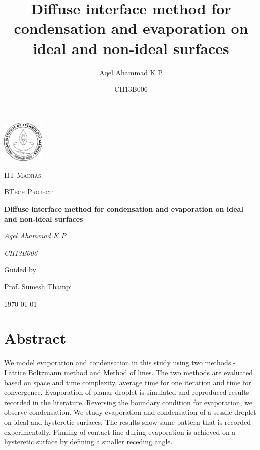 \documentclass[11pt]{article}
\title{Diffuse interface method for condensation and evaporation on ideal and non-ideal surfaces}
\date{CH13B006}
\author{Aqel Ahammad K P}
\begin{document}
\begin{titlepage}
			\centering
			\includegraphics[width=0.15\textwidth]{images/others/iitm_logo}\par\vspace{1cm}
			{\scshape\LARGE IIT Madras \par}
			\vspace{1cm}
			{\scshape\Large BTech Project\par}
			\vspace{1.5cm}
			{\huge\bfseries Diffuse interface method for condensation and evaporation on ideal and non-ideal surfaces\par}
			\vspace{2cm}
			{\Large\itshape Aqel Ahammad K P\par}
			{\Large\itshape CH13B006\par}
			\vfill
			Guided by\par
			Prof. Sumesh Thampi
			
			\vfill
			
			{\large \today\par}
		\end{titlepage}
\tableofcontents
{}
\newpage
{}

\section{Abstract}
We model evaporation and condensation in this study using two methods - Lattice Boltzmann method and Method of lines. The two methods are evaluated based on space and time complexity, average time for one iteration and time for convergence. Evaporation of planar droplet is simulated and reproduced results recorded in the literature. Reversing the boundary condition for evaporation, we observe condensation. We study evaporation and condensation of a sessile droplet on ideal and hysteretic surfaces. The results show same pattern that is recorded experimentally. Pinning of contact line during evaporation is achieved on a hysteretic surface by defining a smaller receding angle. 
\end{document}
